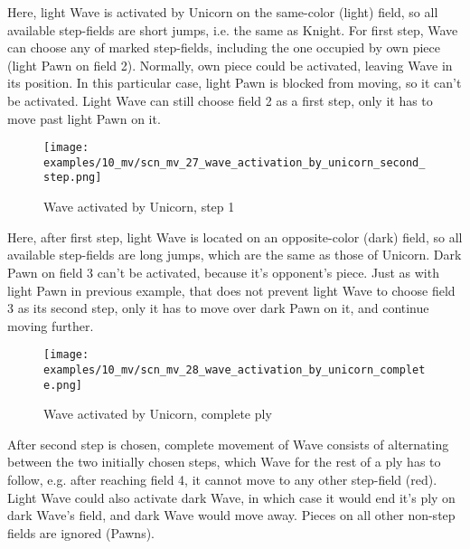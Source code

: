 \vspace*{-0.3\baselineskip}
Here, light Wave is activated by Unicorn on the same-color (light) field, so all available
step-fields are short jumps, i.e. the same as Knight. For first step, Wave can choose any of
marked step-fields, including the one occupied by own piece (light Pawn on field 2). Normally,
own piece could be activated, leaving Wave in its position. In this particular case, light Pawn
is blocked from moving, so it can't be activated. Light Wave can still choose field 2 as a first
step, only it has to move past light Pawn on it.

\clearpage %

\vspace*{-2.1\baselineskip}
\noindent
\begin{figure}[!h]
\texttt{[image: examples/10\_mv/scn\_mv\_27\_wave\_activation\_by\_unicorn\_second\_step.png]}
\caption{Wave activated by Unicorn, step 1}
\label{fig:scn_mv_27_wave_activation_by_unicorn_second_step}
\end{figure}

Here, after first step, light Wave is located on an opposite-color (dark) field, so all available
step-fields are long jumps, which are the same as those of Unicorn. Dark Pawn on field 3 can't be
activated, because it's opponent's piece. Just as with light Pawn in previous example, that does
not prevent light Wave to choose field 3 as its second step, only it has to move over dark Pawn
on it, and continue moving further.

\clearpage %

\vspace*{-2.1\baselineskip}
\noindent
\begin{figure}[!h]
\texttt{[image: examples/10\_mv/scn\_mv\_28\_wave\_activation\_by\_unicorn\_complete.png]}
\caption{Wave activated by Unicorn, complete ply}
\label{fig:scn_mv_28_wave_activation_by_unicorn_complete}
\end{figure}

After second step is chosen, complete movement of Wave consists of alternating between the two initially
chosen steps, which Wave for the rest of a ply has to follow, e.g. after reaching field 4, it cannot move
to any other step-field (red). Light Wave could also activate dark Wave, in which case it would end it's
ply on dark Wave's field, and dark Wave would move away. Pieces on all other non-step fields are ignored
(Pawns).


